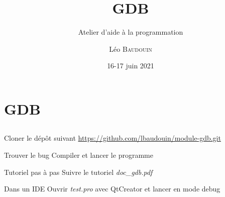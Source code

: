 \documentclass{beamer}
\title{GDB}
\subtitle{Atelier d'aide à la programmation}
\author{L\'eo \textsc{Baudouin}}
\institute{
  {\url{baudouin.leo @ gmail.com}}
}
\date{16-17 juin 2021}
\begin{document}
\begin{frame}
  \titlepage
\end{frame}

\section{GDB}
\subsection{}

\begin{frame}{}

\begin{block}{Cloner le dép\^ot suivant}
\url{https://github.com/lbaudouin/module-gdb.git}
\end{block}

\begin{block}{Trouver le bug}
Compiler et lancer le programme
\end{block}

\begin{block}{Tutoriel pas à pas}
Suivre le tutoriel \emph{doc\_gdb.pdf}\footnotemark
\end{block}

\begin{block}{Dans un IDE}
Ouvrir \emph{test.pro} avec QtCreator et lancer en mode debug
\end{block}


\end{frame}


\end{document}
